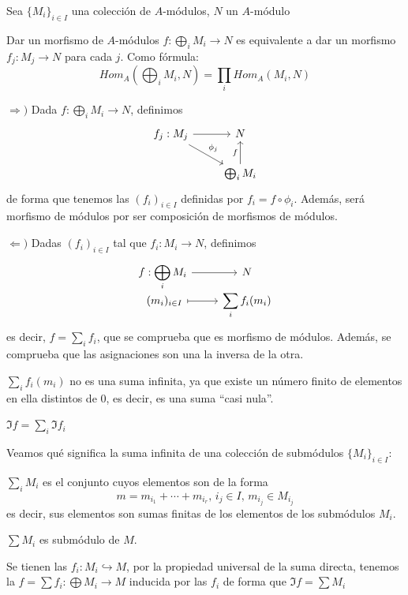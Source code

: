 Sea $\{M_i\}_{i \in I}$ una colecci\'on de $A$-m\'odulos, $N$ un $A$-m\'odulo
\begin{propi}
Dar un morfismo de $A$-m\'odulos $\displaystyle f: \bigoplus_i M_i \longrightarrow N$ es equivalente a dar un morfismo $f_j: M_j \longrightarrow N$ para cada $j$. Como f\'ormula:
$$Hom_A \left( \bigoplus_i M_i, N\right) = \prod_i Hom_A(M_i,N)$$
\end{propi}
\begin{dem}
    $\Rightarrow)$ Dada $\displaystyle f:  \bigoplus_i M_i \longrightarrow N$, definimos
    $$\bt f_j: M_j \arrow{r} \arrow{rd}{\phi_j} & N \\
     &  \bigoplus_i M_i \arrow{u}{f}
    \et$$
     de forma que tenemos las $(f_i)_{i \in I}$ definidas por $f_i = f \circ \phi_i$. Adem\'as, ser\'a morfismo de m\'odulos por ser composici\'on de morfismos de m\'odulos.

     $\Leftarrow)$ Dadas $(f_i)_{i \in I}$ tal que $f_i: M_i \longrightarrow N$, definimos
     $$ \bt 
     f: \displaystyle \bigoplus_i M_i \arrow{r} & N \\[-8mm]
     \, \, (m_i)_{i \in I} \arrow[mapsto]{r} &\displaystyle \sum_i f_i(m_i)
     \et$$
     es decir, $f=\sum_i f_i$, que se comprueba que es morfismo de m\'odulos. Adem\'as, se comprueba que las asignaciones son una la inversa de la otra.
\end{dem}
\begin{obs}
    $\displaystyle \sum_i f_i(m_i)$ no es una suma infinita, ya que existe un n\'umero finito de elementos en ella distintos de 0, es decir, es una suma ``casi nula''.
\end{obs}
\begin{obs}
    $\Im f = \displaystyle \sum_i \Im f_i$
\end{obs}
Veamos qu\'e significa la suma infinita de una colecci\'on de subm\'odulos $\{M_i\}_{i \in I}$:
\begin{defi}
    $\displaystyle \sum_i M_i$ es el conjunto cuyos elementos son de la forma $$m=m_{i_1} + \cdots + m_{i_r}, \, i_{j}\in I, \, m_{i_j}\in M_{i_j}$$ es decir, sus elementos son sumas finitas de los elementos de los subm\'odulos $M_i$.
\end{defi}
\begin{prop}
    $\sum M_i$ es subm\'odulo de $M$.
\end{prop}
\begin{propi}
     Se tienen las $f_i : M_i \hookrightarrow M$, por la propiedad universal de la suma directa, tenemos la $f=\sum f_i : \bigoplus M_i \longrightarrow M$ inducida por las $f_i$ de forma que $\Im f = \sum M_i$
\end{propi}

